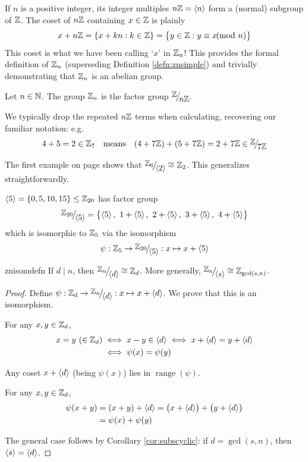 
If $n$ is a positive integer, its integer multiples $n\mathbb{Z}=\left\langle n\right\rangle$ form a (normal) subgroup of $\mathbb{Z}$. The coset of $n\mathbb{Z}$ containing $x\in\mathbb{Z}$ is plainly
\[
	x+n\mathbb{Z}=\{x+kn:k\in\mathbb{Z}\}
	=\bigl\{y\in\mathbb{Z}:y\equiv x\negthickspace\negthickspace\pmod n\bigr\}
\]
This coset is what we have been calling `$x$' in $\mathbb{Z}_n$! This provides the formal definition of $\mathbb{Z}_n$ (superseding Definition \ref{defn:znsimple}) and trivially demonstrating that $\mathbb{Z}_n$ is an abelian group.

\begin{defn}{}{}
	Let $n\in\mathbb{N}$. The group $\mathbb{Z}_n$ is the factor group $\quotient{\Z}{n\Z}$.
\end{defn}

We typically drop the repeated $n\mathbb{Z}$ terms when calculating, recovering our familiar notation: e.g.
\[
	4+5=2\in\Z_7\quad\text{means}\quad (4+7\Z)+(5+7\Z)=2+7\Z \in\quotient{\Z}{7\Z}
\]



The first example on page \pageref{sec:factor} shows that $\quotient{\Z_6}{\ip 2} \cong\Z_2$. This generalizes straightforwardly.

\begin{example}{}{}
	$\left\langle 5\right\rangle=\{0,5,10,15\}\le\mathbb{Z}_{20}$ has factor group
	\[
		\quotient{\Z_{20}}{\ip 5}=\bigl\{\ip 5,\ 1+\ip 5,\ 2+\ip 5,\ 3+\ip 5,\ 4+\ip 5\bigr\}
	\]
	which is isomorphic to $\mathbb{Z}_5$ via the isomorphism
	\[
		\psi:\Z_5\to\quotient{\Z_{20}}{\ip 5}:x\mapsto x+\ip 5
	\]
\end{example}


\begin{thm}{}{znisomdefn}
	If $d\mid n$, then $\quotient{\Z_n}{\ip d}\cong\Z_d$. More generally, $\quotient{\Z_n}{\ip s}\cong\Z_{\gcd(s,n)}$.
\end{thm}

\begin{proof}
	Define $\psi:\Z_d\to\smash{\quotient{\Z_n}{\ip d}}:x\mapsto x+\ip d$. We prove that this is an isomorphism.
	\begin{description}\itemsep2pt
		\item[\normalfont\emph{Well-definition/injectivity}:] For any $x,y\in\mathbb{Z}_d$,
		\begin{align*}
			x=y\ (\in\mathbb{Z}_d)&\iff x-y\in\left\langle d\right\rangle\iff x+\left\langle d\right\rangle=y+\left\langle d\right\rangle\\
			&\iff \psi(x)=\psi(y)
		\end{align*}
		\item[\normalfont\emph{Surjectivity}:] Any coset $x+\left\langle d\right\rangle$ (being $\psi(x)$) lies in $\operatorname{range}(\psi)$.	
		\item[\normalfont\emph{Homomorphism}:] For any $x,y\in\mathbb{Z}_d$,
		\begin{align*}
			\psi(x+y)&=(x+y)+\left\langle d\right\rangle =\bigl(x+\left\langle d\right\rangle\bigr)+\bigl(y+\left\langle d\right\rangle\bigr)\\
			&=\psi(x)+\psi(y)
		\end{align*}
	\end{description}
	The general case follows by Corollary \ref{cor:subscyclic}: if $d=\gcd(s,n)$, then  $\left\langle s\right\rangle=\left\langle d\right\rangle$.
\end{proof}


